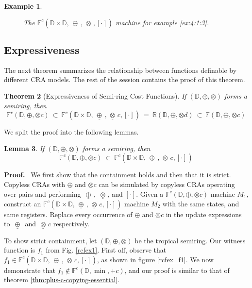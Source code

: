 \documentclass[11pt]{article}
\newtheorem{theorem}{Theorem}
\newtheorem{lemma}[theorem]{Lemma}
\newtheorem{example}[theorem]{Example}
\def\Proof{{\bf Proof.}}
\newcommand{\mypar}[1]{\subsection{#1}}
\newcommand{\domain}{\ensuremath{\mathbb{D}}}
\newcommand{\CF}{{\mathbb F}}
\newcommand{\CCF}{{\mathbb F}^c}
\newcommand{\reg}[1]{{\mathbb R}(#1)}
\newcommand{\sradd}{\oplus}
\newcommand{\srmul}{\otimes}
\def\myplus{\otimes}
\def\mytimes{\oplus}
\def\dadd{\,\underline\mytimes\,}
\def\dscale{\,\underline\myplus\,}
\begin{document}
\begin{example}
\begin{figure}
\caption{\label{fig:4:1:3}The
$\CCF\left(\domain\times\domain,\dadd,\dscale,\left[\cdot\right]\right)$
machine for example \ref{ex:4:1:3}.}
\end{figure}

\end{example}

\mypar{Expressiveness}

The next theorem summarizes the relationship between functions definable by different CRA models. The rest of the session contains the proof of this theorem.

\begin{theorem}[Expressiveness of Semi-ring Cost Functions]\label{thm:semiring-exp}
If $\left(\domain,\sradd,\srmul\right)$ forms a semiring, then
\[
\CCF(\domain,\sradd,\srmul c)\ \subset\ \CCF\left(\domain\times\domain,\dadd,\dscale c,\left[\cdot\right]\right)\ =\
\reg{\domain,\sradd,\srmul d}\ \subset\ \CF(\domain,\sradd,\srmul c)
\]
\end{theorem}
We split the proof into the following lemmas.
\begin{lemma}
If $\left(\domain,\sradd,\srmul\right)$ forms a semiring, then
\[ \CCF(\domain,\sradd,\srmul c)\ \subset\ \CCF\left(\domain\times\domain,\dadd,\dscale c,\left[\cdot\right]\right) \]
\end{lemma}
\Proof~
We first show that the containment holds and then that it is strict.
Copyless CRAs with $\sradd$ and $\srmul c$ can be simulated by copyless CRAs operating over pairs and performing $\dadd$, $\dscale$, and $\left[\cdot\right]$. Given a $\CCF(\domain,\sradd,\srmul c)$ machine $M_{1}$, construct an $\CCF\left(\domain\times\domain,\dadd,\dscale c,\left[\cdot\right]\right)$ machine $M_{2}$ with the same states, and same registers. Replace every occurrence of $\sradd$ and $\srmul c$ in the update expressions to $\dadd$ and $\dscale c$ respectively.

To show strict containment, let $\left(\domain,\sradd,\srmul\right)$
be the tropical semiring. Our witness function is $f_{1}$ from Fig.
\ref{rcfex1}. First off, observe that $f_{1}\in\CCF\left(\domain\times\domain,\dadd,\dscale c,\left[\cdot\right]\right)$,
as shown in figure \ref{rcfex_f1}. We now demonstrate that $f_{1}\notin\CCF(\domain,\min,+c)$,
and our proof is similar to that of theorem \ref{thm:plus-c-copying-essential}.
\end{document}
